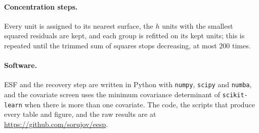 \paragraph{Concentration steps.}
Every unit is assigned to its nearest surface, the $h$ units with the smallest squared
residuals are kept, and each group is refitted on its kept units; this is repeated until the
trimmed sum of squares stops decreasing, at most $200$ times.

\paragraph{Software.}
ESF and the recovery step are written in Python with \texttt{numpy}, \texttt{scipy} and \texttt{numba}, and
the covariate screen uses the minimum covariance determinant of \texttt{scikit-learn} when
there is more than one covariate. The code, the scripts that produce every table and figure,
and the raw results are at \url{https://github.com/sorujov/eesp}.

